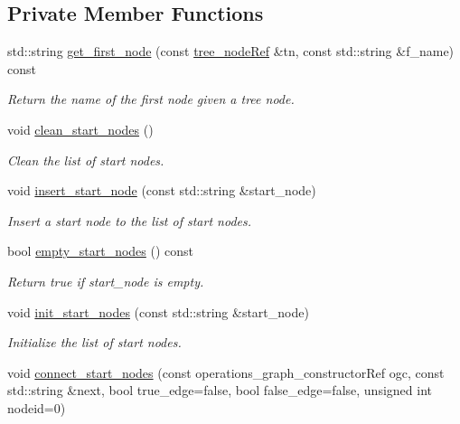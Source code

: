 \subsection*{Private Member Functions}
\begin{DoxyCompactItemize}
\item 
std\+::string \hyperlink{classoperations__cfg__computation_a552a18ba450de75c9651cc9eda82f3ac}{get\+\_\+first\+\_\+node} (const \hyperlink{tree__node_8hpp_a6ee377554d1c4871ad66a337eaa67fd5}{tree\+\_\+node\+Ref} \&tn, const std\+::string \&f\+\_\+name) const
\begin{DoxyCompactList}\small\item\em Return the name of the first node given a tree node. \end{DoxyCompactList}\item 
void \hyperlink{classoperations__cfg__computation_af375bcc0ff06c7e67fe29e1d481c395b}{clean\+\_\+start\+\_\+nodes} ()
\begin{DoxyCompactList}\small\item\em Clean the list of start nodes. \end{DoxyCompactList}\item 
void \hyperlink{classoperations__cfg__computation_af46dd1597651071b58c65df3a5205a92}{insert\+\_\+start\+\_\+node} (const std\+::string \&start\+\_\+node)
\begin{DoxyCompactList}\small\item\em Insert a start node to the list of start nodes. \end{DoxyCompactList}\item 
bool \hyperlink{classoperations__cfg__computation_a3565d9d33d44fce47a2fde3d39392f4b}{empty\+\_\+start\+\_\+nodes} () const
\begin{DoxyCompactList}\small\item\em Return true if start\+\_\+node is empty. \end{DoxyCompactList}\item 
void \hyperlink{classoperations__cfg__computation_ae1d29037a601f373f5d8db0faed1ffbf}{init\+\_\+start\+\_\+nodes} (const std\+::string \&start\+\_\+node)
\begin{DoxyCompactList}\small\item\em Initialize the list of start nodes. \end{DoxyCompactList}\item 
void \hyperlink{classoperations__cfg__computation_a10a94b4065c3e5bf12d59b78873f6dce}{connect\+\_\+start\+\_\+nodes} (const operations\+\_\+graph\+\_\+constructor\+Ref ogc, const std\+::string \&next, bool true\+\_\+edge=false, bool false\+\_\+edge=false, unsigned int nodeid=0)

\end{DoxyCompactItemize}
